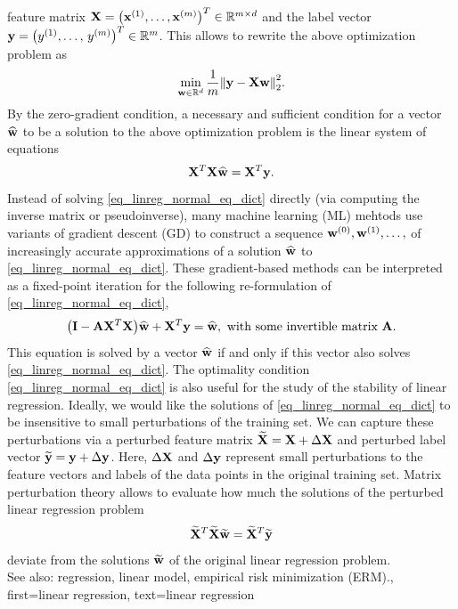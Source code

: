 {{{		 feature matrix ${\bf X} = \big({\bf x}^{(1)},\ldots,{\bf x}^{(m)}\big)^{T} \in \mathbb{R}^{m \times d}$ 
		and the label vector ${\bf y} = \big( y^{(1)},\ldots, \,y^{(m)} \big)^{T} \in \mathbb{R}^{m}$. 
		 This allows to rewrite the above optimization problem as
		 $$\min_{{\bf w} \in \mathbb{R}^{d}} \frac{1}{m} \mleft\lVert {\bf y} - {\bf X} {\bf w} \mright\rVert_{2}^{2}.$$
		 By the zero-gradient condition, a necessary and sufficient condition for a 
		 vector $\widehat{{\bf w}}$ to be a solution to the above optimization problem is the 
		 linear system of equations \cite{StrangLinAlg2016}
		 \begin{equation} 
			\label{eq_linreg_normal_eq_dict}
			{\bf X}^{T}{\bf X} \widehat{{\bf w}} = {\bf X}^{T} {\bf y}.
		 \end{equation}
		 Instead of solving \eqref{eq_linreg_normal_eq_dict} directly 
		 (via computing the inverse matrix or pseudoinverse), 
		 many machine learning (ML) mehtods use variants of gradient descent (GD) to construct a sequence 
		 ${\bf w}^{(0)},{\bf w}^{(1)},\ldots,$ of increasingly accurate approximations 
		 of a solution $\widehat{{\bf w}}$ to \eqref{eq_linreg_normal_eq_dict}. These 
		 gradient-based methods can be interpreted as a fixed-point iteration for the following 
		 re-formulation of \eqref{eq_linreg_normal_eq_dict}, 
		 $$ \big(\mathbf{I} - {\bf A} {\bf X}^{T}{\bf X}\big) \widehat{{\bf w}} + {\bf X}^{T} 
		 {\bf y} = \widehat{{\bf w}}, \mbox{ with some invertible matrix } {\bf A}.$$
		 This equation is solved by a vector $\widehat{{\bf w}}$ if and only if 
		 this vector also solves \eqref{eq_linreg_normal_eq_dict}. The optimality 
		  condition \eqref{eq_linreg_normal_eq_dict} is also useful for the study of 
		  the stability of linear regression. Ideally, we would like the solutions of 
		  \eqref{eq_linreg_normal_eq_dict} to be insensitive to small perturbations 
		  of the training set. We can capture these perturbations via a 
		  perturbed feature matrix $\widetilde{{\bf X}} = {\bf X} + \Delta {\bf X}$
		  and perturbed label 
		  vector $\widetilde{{\bf y}} = {\bf y} + \Delta {\bf y}$. 
		  Here, $\Delta {\bf X}$ and $\Delta {\bf y}$ represent small perturbations
		  to the feature vectors and labels of the data points in the 
		  original training set. Matrix perturbation theory allows to evaluate 
		  how much the solutions of the perturbed linear regression problem \cite[Sec.\ 2.6]{GolubVanLoanBook}
		  $$\widetilde{{\bf X}}^{T} \widetilde{{\bf X}} \widetilde{{\bf w}} = 
		  \widetilde{{\bf X}}^{T} \widetilde{{\bf y}}$$
		  deviate from the solutions $\widetilde{{\bf w}}$ 
		  of the original linear regression problem.
		 \\
		See also: regression, linear model, empirical risk minimization (ERM).},
	first={linear regression},
	text={linear regression}
}
        
}
